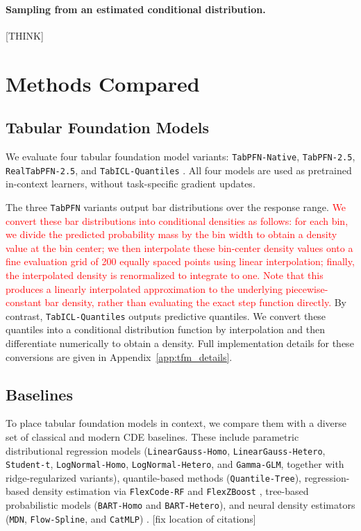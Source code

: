 \documentclass{article}
\newcommand{\method}[1]{\texttt{#1}}
\begin{document}
\paragraph{Sampling from an estimated conditional distribution.}
[THINK]

\section{Methods Compared}
\label{sec:methods}

\subsection{Tabular Foundation Models}
\label{sec:methods_tfm}

We evaluate four tabular foundation model variants:
\method{TabPFN-Native}, \method{TabPFN-2.5}, \method{RealTabPFN-2.5}, and
\method{TabICL-Quantiles}
\citep{hollmann2025tabpfn,qu2025tabicl,qu2026tabiclv2}. All four models are
used as pretrained in-context learners, without task-specific gradient updates.

The three \method{TabPFN} variants output bar distributions over the response
range. \textcolor{red}{We convert these bar distributions into conditional densities as follows: for each bin, we divide the predicted probability mass by the bin width to obtain a density value at the bin center; we then interpolate these bin-center density values onto a fine evaluation grid of 200 equally spaced points using linear interpolation; finally, the interpolated density is renormalized to integrate to one. Note that this produces a linearly interpolated approximation to the underlying piecewise-constant bar density, rather than evaluating the exact step function directly.} By contrast,
\method{TabICL-Quantiles} outputs predictive quantiles. We convert these
quantiles into a conditional distribution function by interpolation and then
differentiate numerically to obtain a density. Full implementation details for
these conversions are given in Appendix~\ref{app:tfm_details}.

\subsection{Baselines}
\label{sec:methods_baselines}

To place tabular foundation models in context, we compare them with a diverse
set of classical and modern CDE baselines. These include parametric
distributional regression models
(\method{LinearGauss-Homo}, \method{LinearGauss-Hetero}, \method{Student-t},
\method{LogNormal-Homo}, \method{LogNormal-Hetero}, and \method{Gamma-GLM},
together with ridge-regularized variants), quantile-based methods
(\method{Quantile-Tree}), regression-based density
estimation via \method{FlexCode-RF} and \method{FlexZBoost} \citep{izbicki2017converting}\textcolor{red}{\citep{dalmasso2020cdetools}}, tree-based
probabilistic models (\method{BART-Homo} and \method{BART-Hetero}), and neural
density estimators (\method{MDN}, \method{Flow-Spline}, and \method{CatMLP})
\citep{bishop1994mixture,chipman2010bart,he2019xbart,durkan2019nsf,
papamakarios2021normalizing}. [fix location of citations]
\end{document}
